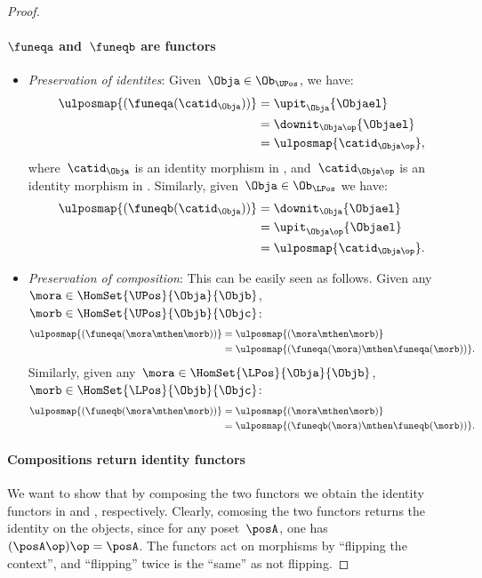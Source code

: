 \begin{proof}
\paragraph*{$\funeqa$ and~$\funeqb$ are functors}
\begin{itemize}
    \item \emph{Preservation of identites}: Given~$\Obja\in \Ob_{\UPos}$, we have:
    \begin{equation*}
        \begin{aligned}
            \ulposmap{(\funeqa(\catid_\Obja))}&=\upit_\Obja\{\Objael\}\\
            &=\downit_{\Obja\op}\{\Objael\}\\
            &=\ulposmap{\catid_{\Obja\op}},
        \end{aligned}
    \end{equation*}
where~$\catid_\Obja$ is an identity morphism in \UPos, and~$\catid_{\Obja\op}$ is an identity morphism in \LPos. Similarly, given~$\Obja\in \Ob_{\LPos}$ we have:
\begin{equation*}
    \begin{aligned}
    \ulposmap{(\funeqb(\catid_\Obja))}&=\downit_\Obja\{\Objael\}\\
    &=\upit_{\Obja\op}\{\Objael\}\\
    &=\ulposmap{\catid_{\Obja\op}}.
    \end{aligned}
\end{equation*}
\item \emph{Preservation of composition}: This can be easily seen as follows. Given any~$\mora\in \HomSet{\UPos}{\Obja}{\Objb}$,~$\morb\in \HomSet{\UPos}{\Objb}{\Objc}$:
\begin{equation*}
    \begin{aligned}
    \ulposmap{(\funeqa(\mora \mthen \morb))}&=\ulposmap{(\mora\mthen \morb)}\\
    &=\ulposmap{(\funeqa(\mora)\mthen \funeqa(\morb))}.
    \end{aligned}
\end{equation*}
Similarly, given any~$\mora\in \HomSet{\LPos}{\Obja}{\Objb}$,~$\morb\in \HomSet{\LPos}{\Objb}{\Objc}$:
\begin{equation*}
    \begin{aligned}
    \ulposmap{(\funeqb(\mora \mthen \morb))}&=\ulposmap{(\mora \mthen \morb)}\\
    &=\ulposmap{(\funeqb(\mora)\mthen \funeqb(\morb))}.
    \end{aligned}
\end{equation*}
\end{itemize}
\paragraph*{Compositions return identity functors}
We want to show that by composing the two functors we obtain the identity functors in \UPos and \LPos, respectively. Clearly, comosing the two functors returns the identity on the objects, since for any poset~$\posA$, one has~$(\posA\op)\op=\posA$. The functors act on morphisms by ``flipping the context'', and ``flipping'' twice is the ``same'' as not flipping.
\end{proof}

